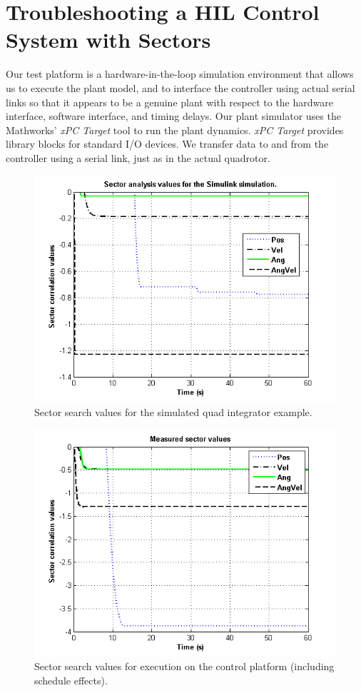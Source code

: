 \section{Troubleshooting a HIL Control System with Sectors}
\label{section:results}

Our test platform is a hardware-in-the-loop simulation environment that allows us to
execute the plant model, and to interface the controller using actual serial links
so that it appears to be a genuine plant with respect to the hardware interface, 
software interface, and timing delays.  Our plant simulator uses the Mathworks' 
\emph{xPC Target} tool to run the plant dynamics\cite{tools:mathworks}. \emph{xPC Target} 
provides library blocks for standard I/O devices.  We transfer data to and from the 
controller using a serial link, just as in the actual quadrotor.

\begin{figure}[htb]
\centering
\includegraphics[width=0.85\columnwidth]{figures/simsectors}
    \caption{Sector search values for the simulated quad integrator example. }
    \label{fig:sectors1}
\end{figure}

\begin{figure}[htb]
\centering
\includegraphics[width=0.85\columnwidth]{figures/meassectors}
    \caption{Sector search values for execution on the control platform
(including schedule effects). }
    \label{fig:sectors2}
\end{figure}


